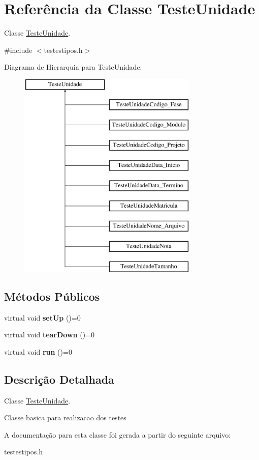 \hypertarget{class_teste_unidade}{
\section{\-Referência da \-Classe \-Teste\-Unidade}
\label{class_teste_unidade}
}


\-Classe \hyperlink{class_teste_unidade}{\-Teste\-Unidade}.  




{\ttfamily \#include $<$testestipos.\-h$>$}

\-Diagrama de \-Hierarquia para \-Teste\-Unidade\-:\begin{figure}[H]
\begin{center}
\leavevmode
\includegraphics[height=10.000000cm]{class_teste_unidade}
\end{center}
\end{figure}
\subsection*{\-Métodos \-Públicos}
\begin{DoxyCompactItemize}
\item 
\hypertarget{class_teste_unidade_a3d7d79d4ecc0b14cc90f1248de551553}{
virtual void {\bfseries set\-Up} ()=0}
\label{class_teste_unidade_a3d7d79d4ecc0b14cc90f1248de551553}

\item 
\hypertarget{class_teste_unidade_a578b38ccb4674170236280c8786f3eb2}{
virtual void {\bfseries tear\-Down} ()=0}
\label{class_teste_unidade_a578b38ccb4674170236280c8786f3eb2}

\item 
\hypertarget{class_teste_unidade_a6b167d0c3937b54e6e4f1f8616324aab}{
virtual void {\bfseries run} ()=0}
\label{class_teste_unidade_a6b167d0c3937b54e6e4f1f8616324aab}

\end{DoxyCompactItemize}


\subsection{\-Descrição \-Detalhada}
\-Classe \hyperlink{class_teste_unidade}{\-Teste\-Unidade}. 

\-Classe basica para realizacao dos testes 

\-A documentação para esta classe foi gerada a partir do seguinte arquivo\-:\begin{DoxyCompactItemize}
\item 
testestipos.\-h\end{DoxyCompactItemize}
